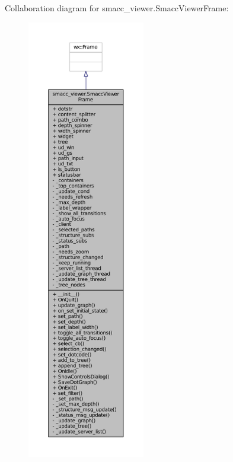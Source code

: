Collaboration diagram for smacc\+\_\+viewer.\+Smacc\+Viewer\+Frame\+:
\nopagebreak
\begin{figure}[H]
\begin{center}
\leavevmode
\includegraphics[height=550pt]{classsmacc__viewer_1_1SmaccViewerFrame__coll__graph}
\end{center}
\end{figure}
